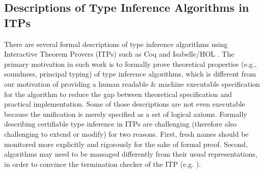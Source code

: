\subsection{Descriptions of Type Inference Algorithms in ITPs}
There are several formal descriptions of type inference algorithms using
Interactive Theorem Provers (ITPs) such as Coq \cite{Dubois00} and
Isabelle/HOL \cite{UrbanN2009}. The primary motivation %
in such work is to formally prove theoretical properties (e.g., soundness,
principal typing) of type inference algorithms, which is different from
our motivation of providing a human readable \& machine executable
specification for the algorithm to reduce the gap between
theoretical specification and practical implementation. Some of those
descriptions  are not even executable because the unification is merely
specified as a set of logical axioms.
Formally describing certifiable type inference in ITPs are challenging
(therefore also challenging to extend or modify) for two reasons. First, fresh
names should be monitored more explicitly and rigorously for the sake of
formal proof. Second, algorithms may need to be massaged differently from
their usual representations, in order to convince the termination checker of
the ITP (e.g. \cite{JFP:185139}).

